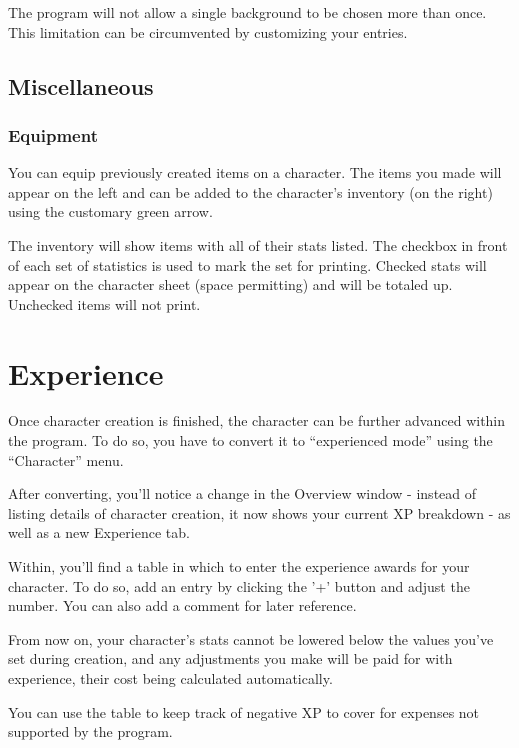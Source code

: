 The program will not allow a single background to be chosen more than once. This limitation can be circumvented by customizing your entries.

\subsection{Miscellaneous}
\subsubsection{Equipment}
You can equip previously created items on a character. The items you made will appear on the left and can be added to the character's inventory (on the right) using the customary green arrow. 

The inventory will show items with all of their stats listed. The checkbox in front of each set of statistics is used to mark the set for printing. Checked stats will appear on the character sheet (space permitting) and will be totaled up.  Unchecked items will not print.

\section{Experience}
Once character creation is finished, the character can be further advanced within the program. To do so, you have to convert it to "`experienced mode"' using the "`Character"' menu.
 
After converting, you'll notice a change in the Overview window - instead of listing details of character creation, it now shows your current XP breakdown - as well as a new Experience tab.

Within, you'll find a table in which to enter the experience awards for your character.  To do so, add an entry by clicking the '+' button and adjust the number. You can also add a comment for later reference.

From now on, your character's stats cannot be lowered below the values you've set during creation, and any adjustments you make will be paid for with experience, their cost being calculated automatically. 

You can use the table to keep track of negative XP to cover for expenses not supported by the program.   

